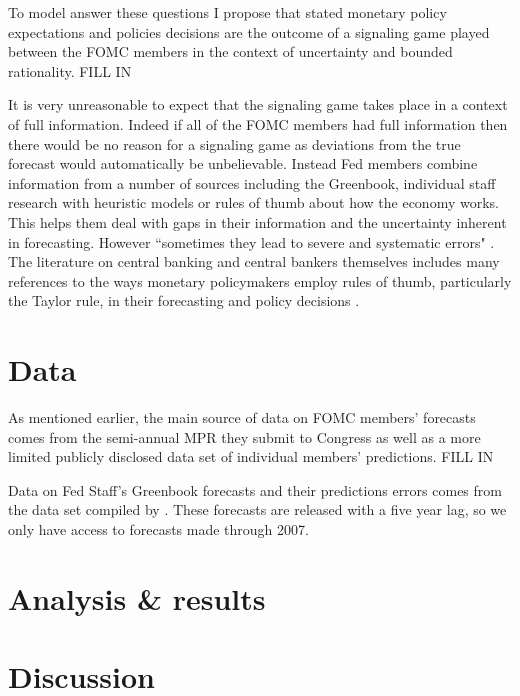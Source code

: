 \documentclass[a4paper]{article}\usepackage{graphicx, color}
\begin{document}
To model answer these questions I propose that stated monetary policy expectations and policies decisions are the outcome of a signaling game played between the FOMC members in the context of uncertainty and bounded rationality. FILL IN

It is very unreasonable to expect that the signaling game takes place in a context of full information. Indeed if all of the FOMC members had full information then there would be no reason for a signaling game as deviations from the true forecast would automatically be unbelievable. Instead Fed members combine information from a number of sources including the Greenbook, individual staff research with heuristic models or rules of thumb about how the economy works. This helps them deal with gaps in their information and the uncertainty inherent in forecasting.  However ``sometimes they lead to severe and systematic errors" \citep[][1124]{tverskykahneman1974}. The literature on central banking and central bankers themselves includes many references to the ways monetary policymakers employ rules of thumb, particularly the Taylor rule, in their forecasting and policy decisions \cite[for example][]{Svensson2003,Orphanides2008,Leitemo2005}. 

\section{Data}

As mentioned earlier, the main source of data on FOMC members' forecasts comes from the semi-annual MPR they submit to Congress as well as a more limited publicly disclosed data set of individual members' predictions. FILL IN

Data on Fed Staff's Greenbook forecasts and their predictions errors comes from the data set compiled by \cite{gandrud2013does}. These forecasts are released with a five year lag, so we only have access to forecasts made through 2007.


\section{Analysis \& results}

\section*{Discussion}



\clearpage



\end{document}
